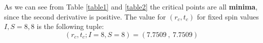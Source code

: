 \documentclass[a4paper]{article}
\begin{document}

As we can see from Table \ref{table1} and \ref{table2} the critical points are all \textbf{minima}, since the second derivative is positive. The value for $(r_c, t_c)$ for fixed spin values $I,S=8, 8$ is the following tuple:
$$(r_c, t_c;I=8,S=8)=(7.7509\ ,\ 7.7509)$$
\end{document}

